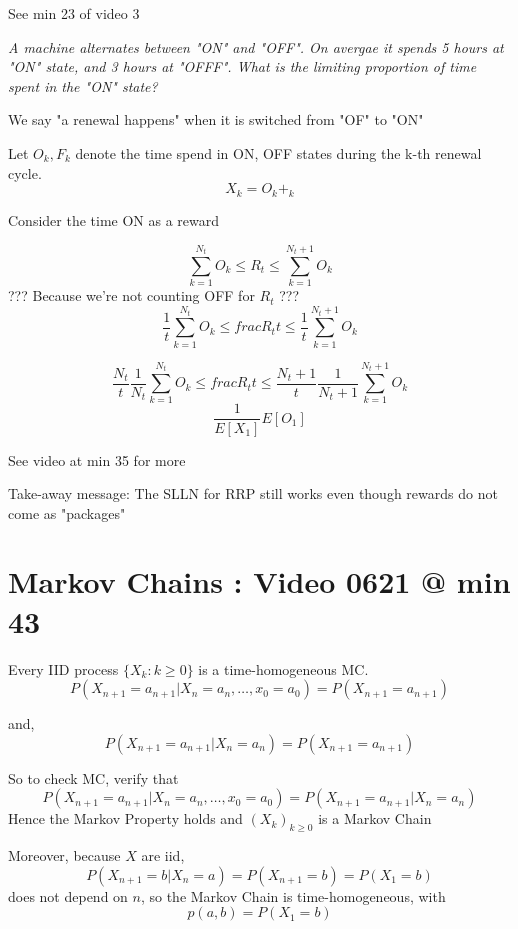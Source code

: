 \documentclass{report}
\begin{document}
   {
    See min 23 of video 3

    \textit{A machine alternates between "ON" and "OFF".  On avergae it
    spends 5 hours at "ON" state, and 3 hours at "OFFF".  What is the
  limiting proportion of time spent in the "ON" state?}

    We say "a renewal happens" when it is switched from "OF" to "ON"

    Let $O_k, F_k$ denote the time spend in ON, OFF states during the k-th
    renewal cycle.
    \[ X_k = O_k + _k \]

    Consider the time ON as a reward

    \[ \sum^{N_t}_{k=1} O_k \leq R_t \leq \sum^{N_t+1}_{k=1} O_k \]
    ??? Because we're not counting OFF for $R_t$ ???
    \[ \frac{1}{t} \sum^{N_t}_{k=1} O_k \leq frac{R_t}{t} \leq \frac{1}{t} \sum^{N_t+1}_{k=1} O_k \]

   \[ \frac{N_t}{t} \frac{1}{N_t} \sum^{N_t}_{k=1} O_k \leq frac{R_t}{t} \leq \frac{N_t+1}{t} \frac{1}{N_t+1} \sum^{N_t+1}_{k=1} O_k \]
    \[ \frac{1}{E[X_1]} E[O_1]  \]

    See video at min 35 for more

  }

  Take-away message:  The SLLN  for RRP still works even though rewards
  do not come as "packages"

  \section{Markov Chains : Video 0621 @ min 43}%
   {
    Every IID process $\{X_k: k \geq 0\}$ is a time-homogeneous MC.
    \[ P(X_{n+1} = a_{n+1} | X_n=a_n, \dots , x_0 = a_0) = 
    P(X_{n+1}=a_{n+1}) \]

    and,
    \[ P(X_{n+1} = a_{n+1} | X_n=a_n) = P(X_{n+1}=a_{n+1}) \]

    So to check MC, verify that 
    \[ P(X_{n+1} = a_{n+1} | X_n=a_n, \dots , x_0 = a_0) = 
     P(X_{n+1} = a_{n+1} | X_n=a_n) \]
   Hence the Markov Property holds and $(X_k)_{k \geq 0}$ is a Markov Chain

   Moreover, because $X$ are iid,
   \[ P(X_{n+1} = b | X_n = a) = P(X_{n+1}=b) =  P(X_1=b) \]
   does not depend on $n$, so the Markov Chain is time-homogeneous, with
   \[ p(a,b) = P(X_1 = b) \]
  }
  
\end{document}
